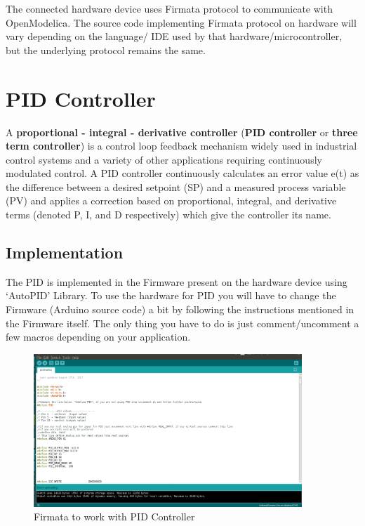 \documentclass[12pt,a4paper]{report}
\begin{document}
The connected hardware device uses Firmata protocol to communicate with OpenModelica. The source code implementing Firmata protocol on hardware will vary depending on the language/ IDE used by that hardware/microcontroller, but the underlying protocol remains the same.

\chapter{\textbf{PID Controller}}
A \textbf{proportional - integral - derivative controller} (\textbf{PID controller} or \textbf{three term controller}) is a control loop feedback mechanism widely used in industrial control systems and a variety of other applications requiring continuously modulated control. A PID controller continuously calculates an error value e(t) as the difference between a desired setpoint (SP) and a measured process variable (PV) and applies a correction based on proportional, integral, and derivative terms (denoted P, I, and D respectively) which give the controller its name.

\section{Implementation}
The PID is implemented in the Firmware present on the hardware device using ‘AutoPID’ Library. To use the hardware for PID you will have to change the Firmware (Arduino source code) a bit by following the instructions mentioned in the Firmware itself. The only thing you have to do is just comment/uncomment a few macros depending on your application.

\begin{figure}[H]
\centering
\includegraphics[width =0.9\textwidth]{pid}
\caption{Firmata to work with PID Controller}
\label{figure:24}
\end{figure}
\end{document}
